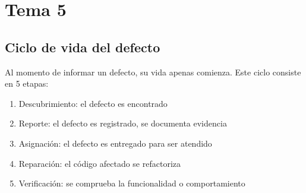 \section*{Tema 5}
    \subsection*{Ciclo de vida del defecto}
        Al momento de informar un defecto, su vida apenas comienza. Este ciclo consiste en 5 etapas:
        
        \begin{enumerate}
            \item Descubrimiento: el defecto es encontrado
            \item Reporte: el defecto es registrado, se documenta evidencia
            \item Asignación: el defecto es entregado para ser atendido
            \item Reparación: el código afectado se refactoriza
            \item Verificación: se comprueba la funcionalidad o comportamiento
        \end{enumerate}

        